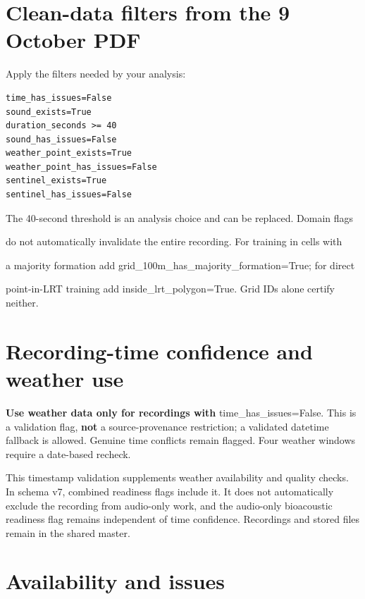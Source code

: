 \documentclass[a4paper,9pt]{extarticle}
\begin{document}
\section*{Clean-data filters from the 9 October PDF}

Apply the filters needed by your analysis:\par

\begin{verbatim}
time_has_issues=False
sound_exists=True
duration_seconds >= 40
sound_has_issues=False
weather_point_exists=True
weather_point_has_issues=False
sentinel_exists=True
sentinel_has_issues=False
\end{verbatim}

The 40-second threshold is an analysis choice and can be replaced. Domain flags\par

do not automatically invalidate the entire recording. For training in cells with\par

a majority formation add grid\_100m\_has\_majority\_formation=True; for direct\par

point-in-LRT training add inside\_lrt\_polygon=True. Grid IDs alone certify neither.\par

\section*{Recording-time confidence and weather use}

\textbf{Use weather data only for recordings with} time\_has\_issues=False. This is a validation flag, \textbf{not} a source-provenance restriction; a validated datetime fallback is allowed. Genuine time conflicts remain flagged. Four weather windows require a date-based recheck.\par

This timestamp validation supplements weather availability and quality checks. In schema v7, combined readiness flags include it. It does not automatically exclude the recording from audio-only work, and the audio-only bioacoustic readiness flag remains independent of time confidence. Recordings and stored files remain in the shared master.\par

\section*{Availability and issues}
\end{document}
